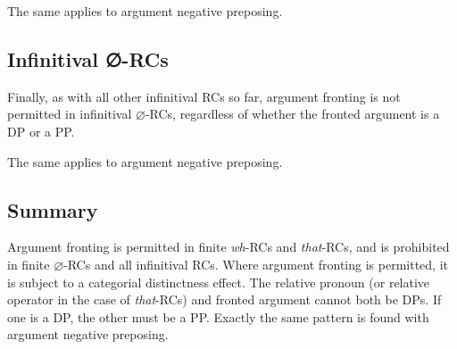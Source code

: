 \documentclass[output=paper]{langsci/langscibook}
\begin{document}
\ea\label{ex:2.67}
    \z
\ex\label{ex:2.68}
    \z
\z
The same applies to argument negative preposing.

\ea\label{ex:2.69}
    \z
\ex\label{ex:2.70}
    \z
\z

\subsection{Infinitival ∅-RCs}

Finally, as with all other infinitival \glspl{RC} so far, argument fronting is not
permitted in infinitival $\varnothing${-RCs, regardless of whether the} fronted
argument is a DP or a PP\@.

\label{ex:2.71}
\label{ex:2.72}
\z
The same applies to argument negative preposing.

\label{ex:2.73}
\label{ex:2.74}
\z

\subsection{Summary}

Argument fronting is permitted in finite \emph{wh}-\glspl{RC} and \emph{that}-RCs, and
is prohibited in finite $\varnothing$-\glspl{RC} and all infinitival \glspl{RC}. Where
argument fronting is permitted, it is subject to a categorial distinctness
effect. The relative pronoun (or relative operator in the case of
\emph{that}-\glspl{RC}) and fronted argument cannot both be DPs. If one is a
DP, the other must be a PP\@.  Exactly the same pattern is found with argument
negative preposing.
\end{document}
